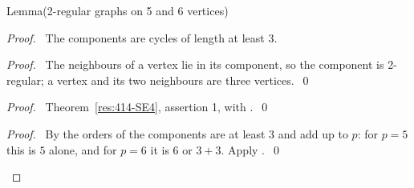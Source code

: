 \begin{namedresult}{Lemma}{(2-regular graphs on 5 and 6 vertices)}\label{lem:414-tworeg}
\end{namedresult}
\begin{proof}
 \pfsketch\ The components are cycles of length at least 3.
 \begin{proof}\pf\ The neighbours of a vertex lie in its component, so the component is
  2-regular; a vertex and its two neighbours are three vertices.~\qed\end{proof}
 \begin{proof}\pf\ Theorem~\ref{res:414-SE4}, assertion 1, with
  .~\qed\end{proof}
 \qedstep
 \begin{proof}\pf\ By  the orders of the components are at least 3 and add up
  to $p$: for $p=5$ this is $5$ alone, and for $p=6$ it is $6$ or $3+3$. Apply
  .~\qed\end{proof}
\end{proof}

